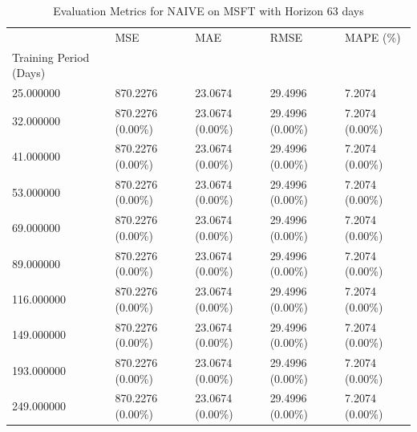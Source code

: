 \begin{table}
\caption{Evaluation Metrics for NAIVE on MSFT with Horizon 63 days}
\label{tab:naive_MSFT_h63_metrics}
\begin{tabular}{lllll}
\toprule
 & MSE & MAE & RMSE & MAPE (\%) \\
Training Period (Days) &  &  &  &  \\
\midrule
25.000000 & 870.2276 & 23.0674 & 29.4996 & 7.2074 \\
32.000000 & 870.2276 (0.00\%) & 23.0674 (0.00\%) & 29.4996 (0.00\%) & 7.2074 (0.00\%) \\
41.000000 & 870.2276 (0.00\%) & 23.0674 (0.00\%) & 29.4996 (0.00\%) & 7.2074 (0.00\%) \\
53.000000 & 870.2276 (0.00\%) & 23.0674 (0.00\%) & 29.4996 (0.00\%) & 7.2074 (0.00\%) \\
69.000000 & 870.2276 (0.00\%) & 23.0674 (0.00\%) & 29.4996 (0.00\%) & 7.2074 (0.00\%) \\
89.000000 & 870.2276 (0.00\%) & 23.0674 (0.00\%) & 29.4996 (0.00\%) & 7.2074 (0.00\%) \\
116.000000 & 870.2276 (0.00\%) & 23.0674 (0.00\%) & 29.4996 (0.00\%) & 7.2074 (0.00\%) \\
149.000000 & 870.2276 (0.00\%) & 23.0674 (0.00\%) & 29.4996 (0.00\%) & 7.2074 (0.00\%) \\
193.000000 & 870.2276 (0.00\%) & 23.0674 (0.00\%) & 29.4996 (0.00\%) & 7.2074 (0.00\%) \\
249.000000 & 870.2276 (0.00\%) & 23.0674 (0.00\%) & 29.4996 (0.00\%) & 7.2074 (0.00\%) \\
\bottomrule
\end{tabular}
\end{table}
